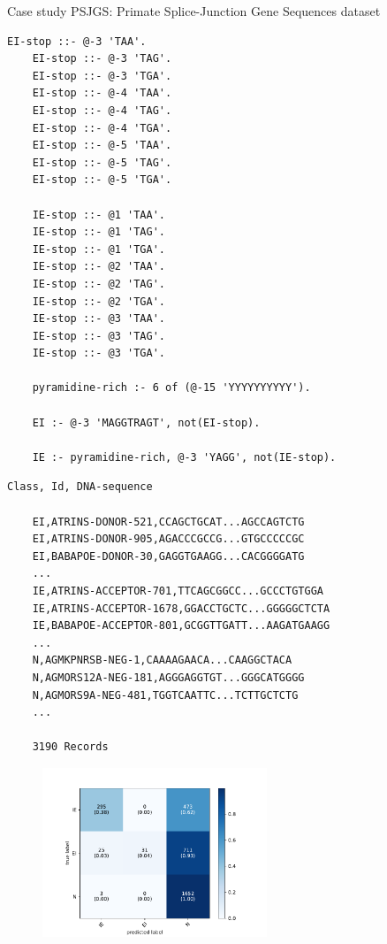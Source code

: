 \documentclass[presentation]{beamer}\mode<presentation>{\usetheme{AMSBolognaFC}}
\begin{document}

\begin{frame}{Case study}
    PSJGS: Primate Splice-Junction Gene Sequences dataset
    \begin{minipage}{0.5\textwidth}
        \begin{lstlisting}[language={}, basicstyle=\ttfamily\tiny,frame=none]
    EI-stop ::- @-3 'TAA'.
    EI-stop ::- @-3 'TAG'.
    EI-stop ::- @-3 'TGA'.
    EI-stop ::- @-4 'TAA'.
    EI-stop ::- @-4 'TAG'.
    EI-stop ::- @-4 'TGA'.
    EI-stop ::- @-5 'TAA'.
    EI-stop ::- @-5 'TAG'.
    EI-stop ::- @-5 'TGA'.
    
    IE-stop ::- @1 'TAA'.
    IE-stop ::- @1 'TAG'.
    IE-stop ::- @1 'TGA'.
    IE-stop ::- @2 'TAA'.
    IE-stop ::- @2 'TAG'.
    IE-stop ::- @2 'TGA'.
    IE-stop ::- @3 'TAA'.
    IE-stop ::- @3 'TAG'.
    IE-stop ::- @3 'TGA'.
    
    pyramidine-rich :- 6 of (@-15 'YYYYYYYYYY').
    
    EI :- @-3 'MAGGTRAGT', not(EI-stop).
    
    IE :- pyramidine-rich, @-3 'YAGG', not(IE-stop).
        \end{lstlisting}
    \end{minipage}
    \vline
    \begin{minipage}{0.45\textwidth}
        \begin{lstlisting}[language={}, basicstyle=\ttfamily\tiny,frame=none]           
    Class, Id, DNA-sequence
    
    EI,ATRINS-DONOR-521,CCAGCTGCAT...AGCCAGTCTG
    EI,ATRINS-DONOR-905,AGACCCGCCG...GTGCCCCCGC
    EI,BABAPOE-DONOR-30,GAGGTGAAGG...CACGGGGATG
    ...
    IE,ATRINS-ACCEPTOR-701,TTCAGCGGCC...GCCCTGTGGA
    IE,ATRINS-ACCEPTOR-1678,GGACCTGCTC...GGGGGCTCTA
    IE,BABAPOE-ACCEPTOR-801,GCGGTTGATT...AAGATGAAGG
    ...
    N,AGMKPNRSB-NEG-1,CAAAAGAACA...CAAGGCTACA
    N,AGMORS12A-NEG-181,AGGGAGGTGT...GGGCATGGGG
    N,AGMORS9A-NEG-481,TGGTCAATTC...TCTTGCTCTG
    ...
    
    3190 Records
        \end{lstlisting}
    \end{minipage}

    \framebreak
    
    
    
    \framebreak
    
    \begin{figure}
        \centering
        \includegraphics[width=0.6\textwidth]{figures/dna-rules-confusion-matrix}
    \end{figure}
    

\end{frame}
\end{document}
